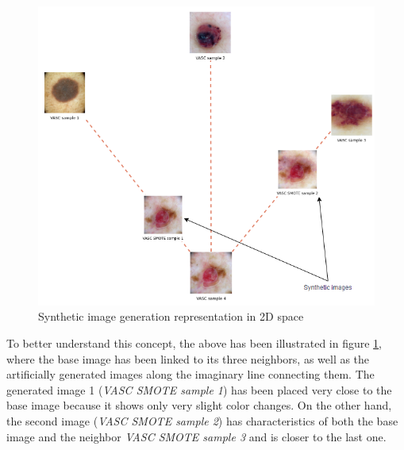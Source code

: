 \begin{figure}[ht]
    \begin{center}
        \includegraphics[scale=0.6]{images/Building/SMOTE/Smote_examples_knn.png}
        \caption{Synthetic image generation representation in 2D space}
    \label{fig: Smote_knn_representation}    
    \end{center}
\end{figure}

To better understand this concept, the above has been illustrated in figure \ref{fig: Smote_knn_representation}, where the base image has been linked to its three neighbors, as well as the artificially generated images along the imaginary line connecting them. The generated image 1 (\textit{VASC SMOTE sample 1}) has been placed very close to the base image because it shows only very slight color changes. On the other hand, the second image (\textit{VASC SMOTE sample 2}) has characteristics of both the base image and the neighbor \textit{VASC SMOTE sample 3} and is closer to the last one.



